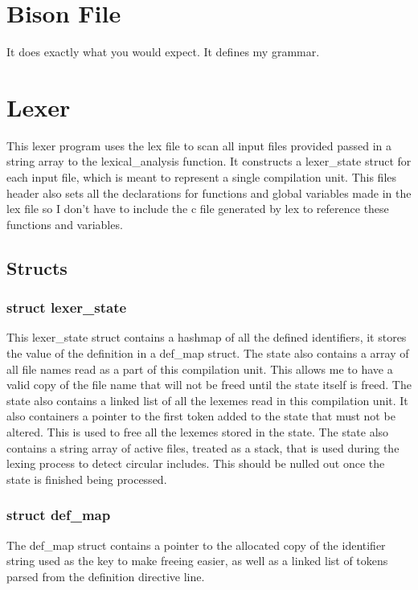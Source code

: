\documentclass[11pt]{article}
\begin{document}
    \section{Bison File}
        It does exactly what you would expect. It defines my grammar.

    \section{Lexer}
        This lexer program uses the lex file to scan all input files provided passed in a string array to the lexical\_analysis function.
        It constructs a lexer\_state struct for each input file, which is meant to represent a single compilation unit. This files
        header also sets all the declarations for functions and global variables made in the lex file so I don't have to include the 
        c file generated by lex to reference these functions and variables.
        
        \subsection{Structs}

            \subsubsection{struct lexer\_state}
                This lexer\_state struct contains a hashmap of all the defined identifiers, it stores the value of the definition in a def\_map struct.
                The state also contains a array of all file names read as a part of this compilation unit. This allows me to have a valid copy of the
                file name that will not be freed until the state itself is freed. The state also contains a linked list of all the lexemes read 
                in this compilation unit. It also containers a pointer to the first token added to the state that must not be altered. This is 
                used to free all the lexemes stored in the state. The state also contains a string array of active files, treated as a stack,
                that is used during the lexing process to detect circular includes. This should be nulled out once the state is finished being processed. 
            
            \subsubsection{struct def\_map}
                The def\_map struct contains a pointer to the allocated copy of the identifier string used as the key to make freeing easier,
                as well as a linked list of tokens parsed from the definition directive line.
\end{document}
